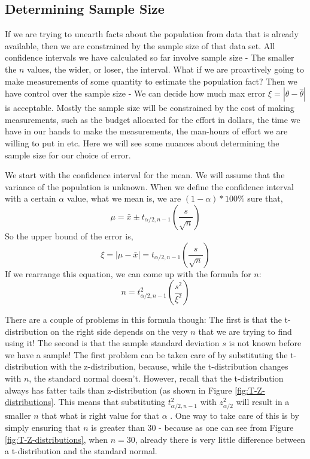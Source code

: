\subsection{Determining Sample Size}
If we are trying to unearth facts about the population from data that is already available, then we are constrained by the sample size of that data set. All confidence intervals we have calculated so far involve sample size - The smaller the $n$ values, the wider, or loser, the interval. What if we are proavtively going to make measurements of some quantity to estimate the population fact? Then we have control over the sample size - We can decide how much max error \( \xi = |\theta - \hat{\theta}| \) is acceptable. Mostly the sample size will be constrained by the cost of making measurements, such as the budget allocated for the effort in dollars, the time we have in our hands to make the measurements, the man-hours of effort we are willing to put in etc. Here we will see some nuances about determining the sample size for our choice of error. 

We start with the confidence interval for the mean. We will assume that the variance of the population is unknown. When we define the confidence interval with a certain $\alpha$ value, what we mean is, we are \( (1-\alpha)*100\% \) sure that,
	\[ \mu = \bar{x} \pm t_{\alpha/2,n-1}\left(\dfrac{s}{\sqrt{n}}\right) \]
So the upper bound of the error is,
	\[ \xi = |\mu - \bar{x}| = t_{\alpha/2,n-1} \left(\dfrac{s}{\sqrt{n}}\right) \]
If we rearrange this equation, we can come up with the formula for $n$:	
	\[ n = t_{\alpha/2,n-1}^2 \left(\dfrac{s^2}{\xi^2}\right) \]

There are a couple of problems in this formula though: The first is that the t-distribution on the right side depends on the very $n$ that we are trying to find using it! The second is that the sample standard deviation $s$ is not known before we have a sample! The first problem can be taken care of by substituting the t-distribution with the z-distribution, because, while the t-distribution changes with $n$, the standard normal doesn't. However, recall that the t-distribution always has fatter tails than z-distribution (as shown in Figure \ref{fig:T-Z-distributions}. This means that substituting \( t_{\alpha/2,n-1}^2 \) with \( z_{\alpha/2}^2 \) will result in a smaller $n$ that what is right value for that $\alpha$ . One way to take care of this is by simply ensuring that $n$ is greater than 30 - because as one can see from Figure \ref{fig:T-Z-distributions}, when $n=30$, already there is very little difference between a t-distribution and the standard normal. 

